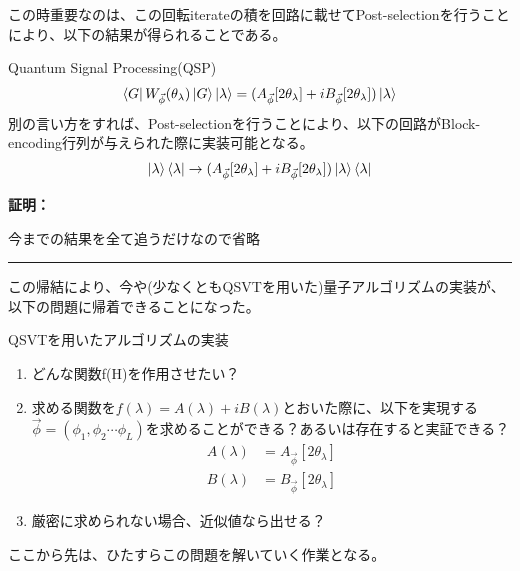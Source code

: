 \documentclass[a4paper,10.5pt]{article}
\numberwithin{equation}{section}
\newenvironment{proofbox}
{\begin{prooflabel}\textbf{証明：}\end{prooflabel}\vspace{0.8em}}
{\par\vspace{1em}\hrule\vspace{1em}}
\begin{document}
この時重要なのは、この回転iterateの積を回路に載せてPost-selectionを行うことにより、以下の結果が得られることである。
\begin{theorembox}{Quantum Signal Processing(QSP)}
    \begin{align*}
        \bra{G}W_{\vec{\phi}}(\theta_{\lambda})\ket{G}\ket{\lambda}=(A_{\vec{\phi}}[2\theta_{\lambda}]+
        iB_{\vec{\phi}}[2\theta_{\lambda}])\ket{\lambda}
    \end{align*}
    別の言い方をすれば、Post-selectionを行うことにより、以下の回路がBlock-encoding行列が与えられた際に実装可能となる。
    \begin{align*}
        \ket{\lambda}\bra{\lambda}\to (A_{\vec{\phi}}[2\theta_{\lambda}]+
        iB_{\vec{\phi}}[2\theta_{\lambda}])\ket{\lambda}\bra{\lambda}
    \end{align*}
\end{theorembox}
\begin{proofbox}
    今までの結果を全て追うだけなので省略
\end{proofbox}
この帰結により、今や(少なくともQSVTを用いた)量子アルゴリズムの実装が、以下の問題に帰着できることになった。
\begin{problembox}{QSVTを用いたアルゴリズムの実装}
    \begin{enumerate}
        \item どんな関数f(H)を作用させたい？
        \item 求める関数を$f(\lambda)=A(\lambda)+iB(\lambda)$とおいた際に、以下を実現する$\vec{\phi}=(\phi_{1},\phi_{2}\cdots \phi_{L})$を求めることができる？あるいは存在すると実証できる？
        \begin{align*}
            A(\lambda)&=A_{\vec{\phi}}[2\theta_{\lambda}]\\
            B(\lambda)&=B_{\vec{\phi}}[2\theta_{\lambda}]
        \end{align*}
        \item 厳密に求められない場合、近似値なら出せる？
    \end{enumerate}
\end{problembox}
ここから先は、ひたすらこの問題を解いていく作業となる。\\
\end{document}
